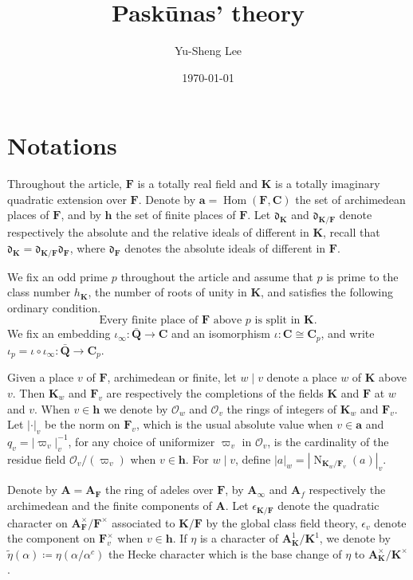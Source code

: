\documentclass[leqno]{amsart}
\theoremstyle{definition}
\theoremstyle{remark}
\newcommand{\oo}{\mathcal{O}}
\newcommand{\Q}{{\mathbf{Q}}}
\newcommand{\C}{\mathbf C}
\newcommand{\A}{\mathbf A}
\newcommand{\dd}{\mathfrak{d}} %
\newcommand{\arch}{\mathbf{a}}
\newcommand{\finite}{\mathbf{h}}
\DeclareMathOperator{\Nr}{N}
\DeclareMathOperator{\Hom}{Hom}
\newcommand{\F}{{\mathbf{F}}} %
\newcommand{\K}{{\mathbf{K}}} %
\newcommand{\qch}{\epsilon} %
\begin{document}
\title{Pask\={u}nas' theory}
\author[Y-S.~Lee]{Yu-Sheng Lee}
\address{Department of Mathematics, University  of Michigan, Ann Arbor, MI 48109, USA}
\date{\today}

\maketitle
\setcounter{tocdepth}{1}
\tableofcontents

\section{Notations}

Throughout the article, $\F$ is a totally real field
and $\K$ is a totally imaginary quadratic extension over $\F$.
Denote by $\arch=\Hom(\F, \C)$ 
the set of archimedean places of $\F$,
and by $\finite$ the set of finite places of $\F$.
Let $\dd_\K$ and $\dd_{\K/\F}$ denote respectively 
the absolute and the relative ideals of different in $\K$,
recall that $\dd_\K=\dd_{\K/\F}\dd_\F$,
where $\dd_\F$ denotes 
the absolute ideals of different in $\F$.

We fix an odd prime $p$ throughout the article
and assume that $p$ is prime to the class number $h_\K$,
the number of roots of unity in $\K$,
and satisfies the following ordinary condition.
\begin{equation}\label{cond:ord}\tag{ord}
\text{Every finite place of $\F$ above $p$ is split in $\K$}.
\end{equation}
We fix an embedding $\iota_\infty:\bar{\Q}\to \C$
and an isomorphism $\iota:\C\cong \C_p$,
and write $\iota_p=\iota\circ\iota_\infty:\bar{\Q}\to \C_p$.


Given a place $v$ of $\F$, archimedean or finite,
let $w\mid v$ denote a place $w$ of $\K$ above $v$.
Then $\K_w$ and $\F_v$ are respectively
the completions of the fields $\K$ and $\F$ at $w$ and $v$.
When $v\in \finite$ we denote by $\oo_w$ and $\oo_v$ 
the rings of integers of $\K_w$ and $\F_v$.
Let $|\cdot|_v$ be the norm on $\F_v$,
which is the usual absolute value when $v\in \arch$
and $q_v=|\varpi_v|_v^{-1}$,
for any choice of uniformizer $\varpi_v$ in $\oo_v$,
is the cardinality of the residue field $\oo_v/(\varpi_v)$
when $v\in \finite$.
For $w\mid v$, define $|a|_w=|\Nr_{\K_w/\F_v}(a)|_v$.


Denote by $\A=\A_{\F}$ the ring of adeles over $\F$,
by $\A_{\infty}$ and $\A_{f}$ respectively
the archimedean and the finite components of $\A$.
Let $\qch_{\K/\F}$ denote 
the quadratic character on $\A_\F^\times/\F^\times$
associated to $\K/\F$ by the global class field theory,
$\qch_v$ denote the component on $\F_v^\times$ 
when $v\in \finite$.
If $\eta$ is a character of $\A_\K^1/\K^1$, 
we denote
by $\tilde{\eta}(\alpha)\coloneqq \eta(\alpha/\alpha^c)$
the Hecke character which is the base change of $\eta$ 
to $\A_\K^\times/\K^\times$.
\end{document}
